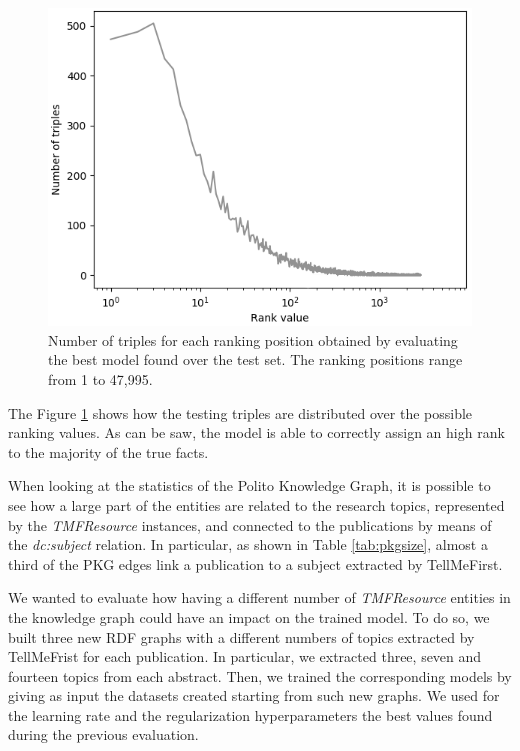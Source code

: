 \documentclass[%
    corpo=13.5pt,
    twoside,
    oldstyle,
    tipotesi=magistrale,
    greek,
    evenboxes
]{toptesi}
\begin{document}
\begin{figure}[h]
    \centering
    \includegraphics[scale=0.8]{img/num_triples_per_rank.png}
    \caption{
        Number of triples for each ranking position obtained by
        evaluating the best model found over the test set. The ranking
        positions range from 1 to 47,995.
    }
    \label{fig:num-triples-per-rank}
\end{figure}

The Figure \ref{fig:num-triples-per-rank} shows how the testing triples are
distributed over the possible ranking values.
As can be saw, the model is able to correctly assign an high rank to the
majority of the true facts.
\newpage

When looking at the statistics of the Polito Knowledge Graph, it is possible to
see how a large part of the entities are related
to the research topics, represented by the \emph{TMFResource} instances,
and connected to the publications by means of the \emph{dc:subject} relation.
In particular, as shown in Table \ref{tab:pkgsize}, almost a third of the
PKG edges link a publication to a subject extracted by TellMeFirst.

We wanted to evaluate how having a different number of \emph{TMFResource}
entities in the knowledge graph could have an impact on the trained model.
To do so, we built three new RDF graphs with a different numbers of topics
extracted by TellMeFrist for each publication.
In particular, we extracted three, seven and fourteen topics from each abstract.
Then, we trained the corresponding models by giving as input the datasets
created starting from such new graphs.
We used for the learning rate and the regularization hyperparameters the best
values found during the previous evaluation.
\end{document}
